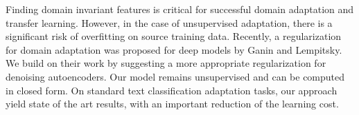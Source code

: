 Finding domain invariant features is critical for successful domain adaptation and transfer learning. However, in the case of unsupervised adaptation, there is a significant risk of overfitting on source training data. Recently, a regularization for domain adaptation was proposed for deep models by Ganin and Lempitsky. We build on their work by suggesting a more appropriate regularization for denoising autoencoders. Our model remains unsupervised and can be computed in closed form. On standard text classification adaptation tasks, our approach yield state of the art results, with an important reduction of the learning cost.
